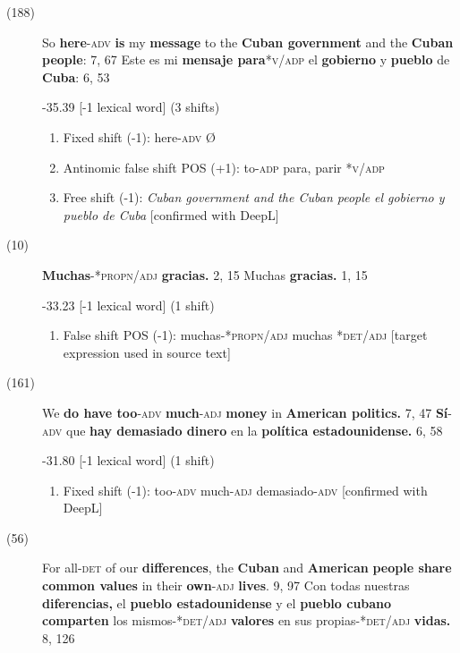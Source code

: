 \documentclass[output=paper]{langsci/langscibook}
\begin{document}
\begin{description}
  \item[(188)] So \textbf{here}\textsc{-adv} \textbf{is} my \textbf{message }to the \textbf{Cuban government} and the \textbf{Cuban people}: 7, 67 \rightarrow Este es mi \textbf{mensaje para}*\textsc{v/adp} el \textbf{gobierno} y \textbf{pueblo }de \textbf{Cuba}: 6, 53

    -35.39 [-1 lexical word] (3 shifts)

    \begin{enumerate}
      \item Fixed shift (-1): here-\textsc{adv} \rightarrow Ø
      \item Antinomic false shift POS (+1): to-\textsc{adp} \rightarrow para, parir *\textsc{v/adp}
      \item Free shift (-1): \textit{Cuban government and the Cuban people } \rightarrow \textit{el gobierno y pueblo de Cuba} [confirmed with DeepL]
    \end{enumerate}

  \item[(10)] \textbf{Muchas}\textsc{-*propn/adj} \textbf{gracias.} 2, 15 \rightarrow Muchas \textbf{gracias.} 1, 15

    -33.23 [-1 lexical word] (1 shift)

    \begin{enumerate}
      \item False shift POS (-1): muchas-*\textsc{propn/adj} \rightarrow muchas *\textsc{det/adj} [target expression used in source text]
    \end{enumerate}

  \item[(161)] We \textbf{do have too}\textsc{-adv} \textbf{much}\textsc{-adj} \textbf{money} in \textbf{American politics.} 7, 47 \rightarrow \textbf{Sí}\textsc{-adv} que \textbf{hay demasiado dinero} en la \textbf{política estadounidense.} 6, 58

    -31.80 [-1 lexical word] (1 shift)

    \begin{enumerate}
      \item Fixed shift (-1): too\textsc{-adv} much-\textsc{adj} \rightarrow demasiado-\textsc{adv} [confirmed with DeepL]
    \end{enumerate}

  \item[(56)] For all\textsc{-det} of our \textbf{differences}, the \textbf{Cuban} and \textbf{American} \textbf{people share common values} in their \textbf{own}\textsc{-adj} \textbf{lives}. 9, 97 \rightarrow Con todas nuestras \textbf{diferencias,} el \textbf{pueblo estadounidense} y el \textbf{pueblo cubano} \textbf{comparten} los mismos\textsc{-*det/adj} \textbf{valores }en sus propias\textsc{-*det/adj}\textsuperscript{ }\textbf{vidas.} 8, 126


\end{description}
\end{document}
